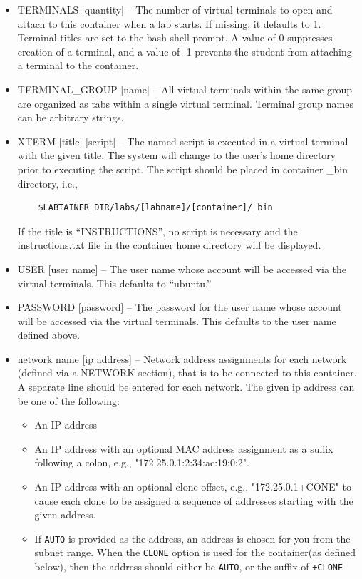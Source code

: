 \documentclass[12pt]{article}
\begin{document}
\begin{itemize}
\begin{itemize}
\item TERMINALS [quantity] -- The number of virtual terminals to open and attach to this 
container when a lab starts.  If missing, it defaults to 1. Terminal titles are set to the 
bash shell prompt. A value of 0 suppresses creation of a terminal, and a value of -1 prevents
the student from attaching a terminal to the container. 
\item TERMINAL\_GROUP [name] -- All virtual terminals within the same group are organized as
tabs within a single virtual terminal.  Terminal group names can be arbitrary strings.
\item XTERM [title] [script] -- The named script is executed in a virtual terminal with the
given title.   The system will change to the user's home directory prior to executing the
script.  The script should be placed in container \_bin directory, i.e.,
\begin{verbatim}
    $LABTAINER_DIR/labs/[labname]/[container]/_bin
\end{verbatim}
\noindent If the title is ``INSTRUCTIONS'', no script is necessary and the instructions.txt file
in the container home directory will be displayed.
\item USER [user name] -- The user name whose account will be accessed via the virtual terminals. 
This defaults to ``ubuntu.''
\item PASSWORD [password] -- The password for the user name whose account will be accessed via the virtual terminals. 
This defaults to the user name defined above.
\item network name [ip address] -- Network address assignments for each network (defined via a NETWORK section), 
that is to be connected to this container.  A separate line should be entered for each network.  The given ip address 
can be one of the following:
\begin{itemize}
\item An IP address 
\item An IP address with an optional MAC address assignment as a suffix following a colon, e.g., "172.25.0.1:2:34:ac:19:0:2".
\item An IP address with an optional clone offset, e.g., "172.25.0.1+CONE" to cause each clone to be assigned a sequence
of addresses starting with the given address.
\item If {\tt AUTO} is provided as the address, an address is chosen for you from the subnet range.  When the {\tt CLONE}
option is used for the container(as defined below), then the address should either be {\tt AUTO}, or the suffix of {\tt +CLONE}

\end{itemize}
\end{itemize}
\end{itemize}
\end{document}
